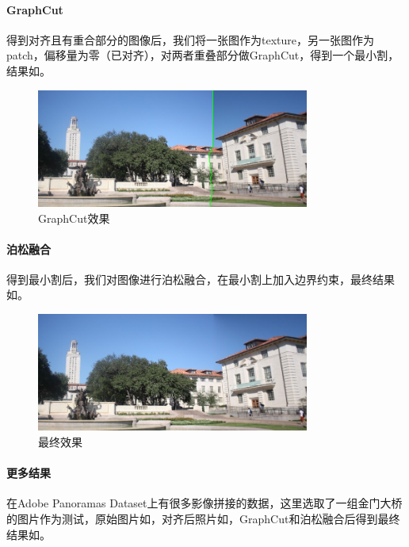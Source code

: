 \documentclass[11pt,a4paper]{article}
\begin{document}
\paragraph{GraphCut} 得到对齐且有重合部分的图像后，我们将一张图作为texture，另一张图作为patch，偏移量为零（已对齐），对两者重叠部分做GraphCut，得到一个最小割，结果如。

\begin{figure}[H]
    \centering
    \includegraphics[width=0.8\textwidth]{../output/campus_graphcut.png}
    \caption{GraphCut效果}
    \label{fig:campus_graphcut}
\end{figure}

\paragraph{泊松融合} 得到最小割后，我们对图像进行泊松融合\cite{perez2003poisson}，在最小割上加入边界约束，最终结果如。

\begin{figure}[H]
    \centering
    \includegraphics[width=0.8\textwidth]{../output/campus_poisson.jpg}
    \caption{最终效果}
    \label{fig:campus_poisson}
\end{figure}

\paragraph{更多结果} 在Adobe Panoramas Dataset上有很多影像拼接的数据，这里选取了一组金门大桥的图片作为测试，原始图片如，对齐后照片如，GraphCut和泊松融合后得到最终结果如。
\end{document}
